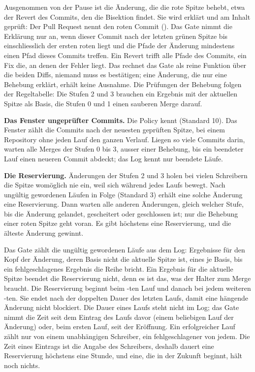 Ausgenommen von der Pause ist die Änderung, die die rote Spitze behebt, etwa der Revert des
Commits, den die Bisektion findet.
Sie wird erklärt und am Inhalt geprüft: Der Pull Request nennt den roten Commit
().
Das Gate nimmt die Erklärung nur an, wenn dieser Commit nach der letzten grünen Spitze bis
einschliesslich der ersten roten liegt
und die Pfade der Änderung mindestens einen Pfad dieses Commits treffen.
Ein Revert trifft alle Pfade des Commits, ein Fix die, an denen der Fehler liegt.
Das rechnet das Gate als reine Funktion über die beiden Diffs, niemand muss es bestätigen;
eine Änderung, die nur eine Behebung erklärt, erhält keine Ausnahme.
Die Prüfungen der Behebung folgen der Regeltabelle:
Die Stufen 2 und 3 brauchen ein Ergebnis mit der aktuellen Spitze als Basis,
die Stufen 0 und 1 einen sauberen Merge darauf.

{\bf Das Fenster ungeprüfter Commits.}
Die Policy kennt  (Standard 10).
Das Fenster zählt die Commits nach der neuesten geprüften Spitze, bei einem Repository ohne
jeden Lauf den ganzen Verlauf.
Liegen so viele Commits darin, warten alle Merges der Stufen 0 bis 3, ausser einer Behebung,
bis ein beendeter Lauf einen neueren Commit abdeckt; das Log kennt nur beendete Läufe.

{\bf Die Reservierung.}
Änderungen der Stufen 2 und 3 holen bei vielen Schreibern die Spitze womöglich nie ein, weil
 sich während jedes Laufs bewegt.
Nach  ungültig gewordenen Läufen in Folge (Standard 3) erhält eine solche Änderung eine
Reservierung.
Dann warten alle anderen Änderungen, gleich welcher Stufe, bis die Änderung gelandet, gescheitert
oder geschlossen ist; nur die Behebung einer roten Spitze geht voran.
Es gibt höchstens eine Reservierung, und die älteste Änderung gewinnt.

Das Gate zählt die ungültig gewordenen Läufe aus dem Log: Ergebnisse für den Kopf der Änderung,
deren Basis nicht die aktuelle Spitze ist, eines je Basis, bis ein fehlgeschlagenes Ergebnis die
Reihe bricht.
Ein Ergebnis für die aktuelle Spitze beendet die Reservierung nicht, denn es ist das, was der
Halter zum Merge braucht.
Die Reservierung beginnt beim -ten Lauf und danach bei jedem weiteren -ten.
Sie endet nach der doppelten Dauer des letzten Laufs, damit eine hängende Änderung
 nicht blockiert.
Die Dauer eines Laufs steht nicht im Log; das Gate nimmt die Zeit seit dem Eintrag des Laufs davor
(einem beliebigen Lauf der Änderung) oder, beim ersten Lauf, seit der Eröffnung.
Ein erfolgreicher Lauf zählt nur von einem unabhängigen Schreiber, ein fehlgeschlagener von jedem.
Die Zeit eines Eintrags ist die Angabe des Schreibers, deshalb dauert eine Reservierung höchstens
eine Stunde, und eine, die in der Zukunft beginnt, hält noch nichts.

